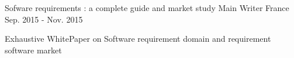 

\begin{cventries}

  \cventry
    {Sofware requirements : a complete guide and market study} %
    {Main Writer} %
    {France} %
    {Sep. 2015 - Nov. 2015} %
    {
      \begin{cvitems} %
        \item {Exhaustive WhitePaper on Software requirement domain and requirement software market}
      \end{cvitems}
    }

\end{cventries}
